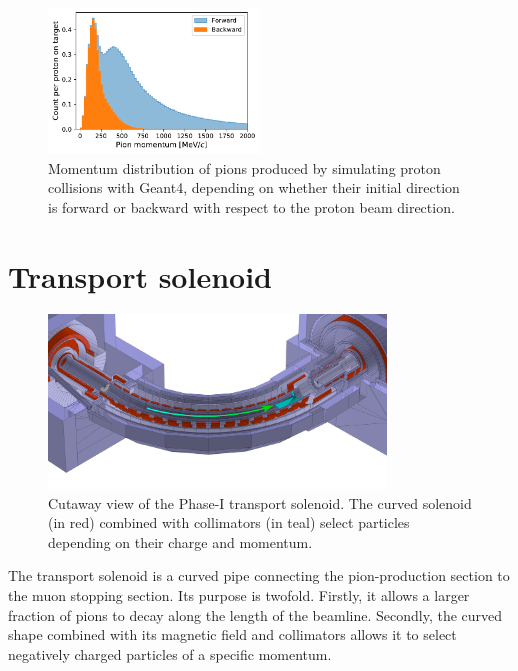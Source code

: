 \begin{figure}
    \centering
    \includegraphics[width=0.5\textwidth]{chapter2/pion_mom-v2.pdf}
    \caption{ Momentum distribution of pions produced by simulating proton
    collisions with Geant4, depending on whether their initial direction is
    forward or backward with respect to the proton beam direction. }
    \label{fig:pion_momentum}
\end{figure}

\section{Transport solenoid}\label{sec:curved_solenoids}

\begin{figure}
    \centering
    \includegraphics[width=0.8\textwidth]{chapter2/transport_solenoid.pdf}
    \caption{ Cutaway view of the Phase-I transport solenoid. The curved
        solenoid (in red) combined with collimators (in teal) select particles
        depending on their charge and momentum. }
    \label{fig:transport_solenoid}
\end{figure}

The transport solenoid is a curved pipe connecting the pion-production section
to the muon stopping section. Its purpose is twofold. Firstly, it allows a
larger fraction of pions to decay along the length of the beamline. Secondly,
the curved shape combined with its magnetic field and collimators allows it to
select negatively charged particles of a specific momentum. 


